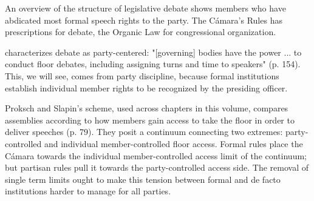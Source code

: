 \documentclass[letter,12pt]{article}
\begin{document}

An overview of the structure of legislative debate shows members who have abdicated most formal speech rights to the party. The Cámara's Rules \citep{reglamentoDipMx.2019} has prescriptions for debate, the Organic Law \citep{loceum.2019} for congressional organization.

\citet{casar.agsetting.2016} characterizes debate as party-centered: "[governing] bodies have the power ... to conduct floor debates, including assigning turns and time to speakers" (p. 154). This, we will see, comes from party discipline, because formal institutions establish individual member rights to be recognized by the presiding officer.


Proksch and Slapin's \citeyearpar{proksch-slapin2015book} scheme, used across chapters in this volume, compares assemblies according to how members gain access to take the floor in order to deliver speeches (p. 79). They posit a continuum connecting two extremes: party-controlled and individual member-controlled floor access. Formal rules place the Cámara towards the individual member-controlled access limit of the continuum; but partisan rules pull it towards the party-controlled access side. The removal of single term limits ought to make this tension between formal and de facto institutions harder to manage for all parties.  
\end{document}
